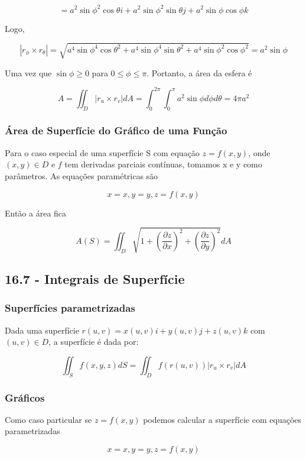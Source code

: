\documentclass[12pt]{article}
\begin{document}
$$ = a^2 \sin{\phi}^2 \cos{\theta}i + a^2 \sin{\phi}^2 \sin{\theta}j + a^2 \sin{\phi} \cos{\phi}k$$

Logo,

$$|r_\phi \times r_\theta| = \sqrt{a^4 \sin{\phi}^4 \cos{\theta}^2 + a^4 \sin{\phi}^4 \sin{\theta}^2 + a^4 \sin{\phi}^2 \cos{\phi}^2} = a^2 \sin{\phi}$$

Uma vez que $\sin{\phi} \geq 0$ para $0 \leq \phi \leq \pi$. Portanto, a área da esfera é

$$A = \iint_D |r_u \times r_v| dA = \int_0 ^{2 \pi} \int_0 ^\pi a^2 \sin{\phi} d \phi d \theta = 4 \pi a^2$$

\subsubsection*{Área de Superfície do Gráfico de uma Função}

Para o caso especial de uma superfície S com equação $z = f(x, y)$, onde $(x, y) \in D$ e $f$
tem derivadas parciais contínuas, tomamos x e y como parâmetros. As equações paramétricas são

$$x = x, y = y, z = f(x, y)$$

Então a área fica

$$A(S) = \iint_D \sqrt{1 + \left(\frac{\partial z}{\partial x}\right)^2 + \left(\frac{\partial z}{\partial y}\right)^2} dA$$

\subsection*{16.7 - Integrais de Superfície}
\label{s8}

\subsubsection*{Superfícies parametrizadas}

Dada uma superfície $r(u, v) = x(u, v)i + y(u, v)j + z(u, v)k$ com $(u, v) \in D$, a superfície é dada por:

$$\iint_S f(x, y, z) dS = \iint_D f(r(u, v)) |r_u \times r_v| dA$$

\subsubsection*{Gráficos}
Como caso particular se $z = f(x, y)$ podemos calcular a superfície com equações parametrizadas

$$x = x, y = y, z = f(x, y)$$
\end{document}
